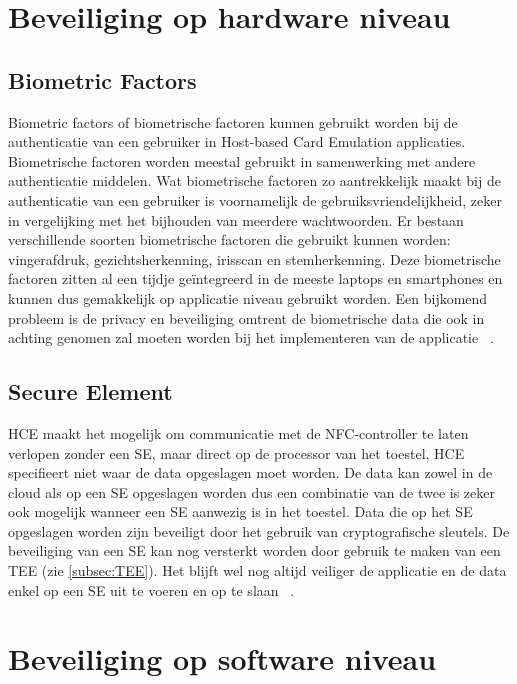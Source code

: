 \section{Beveiliging op hardware niveau}

\subsection{Biometric Factors}
Biometric factors of biometrische factoren kunnen gebruikt worden bij de authenticatie van een gebruiker in Host-based Card Emulation applicaties. Biometrische factoren worden meestal gebruikt in samenwerking met andere authenticatie middelen. Wat biometrische factoren zo aantrekkelijk maakt bij de authenticatie van een gebruiker is voornamelijk de gebruiksvriendelijkheid, zeker in vergelijking met het bijhouden van meerdere wachtwoorden. Er bestaan verschillende soorten biometrische factoren die gebruikt kunnen worden: vingerafdruk, gezichtsherkenning, irisscan en stemherkenning. Deze biometrische factoren zitten al een tijdje geïntegreerd in de meeste laptops en smartphones en kunnen dus gemakkelijk op applicatie niveau gebruikt worden. Een bijkomend probleem is de privacy en beveiliging omtrent de biometrische data die ook in achting genomen zal moeten worden bij het implementeren van de applicatie ~\autocite{SCA2014}.

\subsection{Secure Element}
HCE maakt het mogelijk om communicatie met de NFC-controller te laten verlopen zonder een SE, maar direct op de processor van het toestel, HCE specifieert niet waar de data opgeslagen moet worden. De data kan zowel in de cloud als op een SE opgeslagen worden dus een combinatie van de twee is zeker ook mogelijk wanneer een SE aanwezig is in het toestel. Data die op het SE opgeslagen worden zijn beveiligt door het gebruik van cryptografische sleutels. De beveiliging van een SE kan nog versterkt worden door gebruik te maken van een TEE (zie \ref{subsec:TEE}). Het blijft wel nog altijd veiliger de applicatie en de data enkel op een SE uit te voeren en op te slaan ~\autocite{SCA2014}.


\section{Beveiliging op software  niveau}

